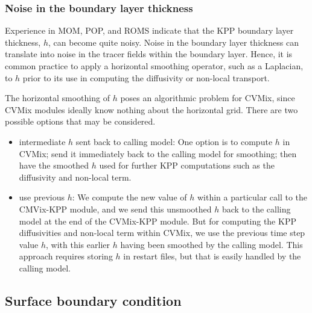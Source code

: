\subsubsection{Noise in the boundary layer thickness}

Experience in MOM, POP, and ROMS indicate that the KPP boundary layer
thickness, $h$, can become quite noisy.  Noise in the boundary layer
thickness can translate into noise in the tracer fields within the
boundary layer.  Hence, it is common practice to apply a horizontal
smoothing operator, such as a Laplacian, to $h$ prior to its use in
computing the diffusivity or non-local transport.

The horizontal smoothing of $h$ poses an algorithmic problem for
CVMix, since CVMix modules ideally know nothing about the horizontal
grid.  There are two possible options that may be considered.
\begin{itemize}

\item {\sc intermediate $h$ sent back to calling model}: One option is
  to compute $h$ in CVMix; send it immediately back to the
  calling model for smoothing; then have the smoothed $h$ used for
  further KPP computations such as the diffusivity and non-local
  term.  

\item {\sc use previous $h$}: We compute the new value of $h$ within a
  particular call to the CMVix-KPP module, and we send this unsmoothed
  $h$ back to the calling model at the end of the CVMix-KPP module.
  But for computing the KPP diffusivities and non-local term within
  CVMix, we use the previous time step value $h$, with this earlier $h$
  having been smoothed by the calling model.  This approach requires
  storing $h$ in restart files, but that is easily handled by the
  calling model.  

\end{itemize}



\subsection{Surface boundary condition}
\label{subsection:kpp-surface-boundary-condition}

